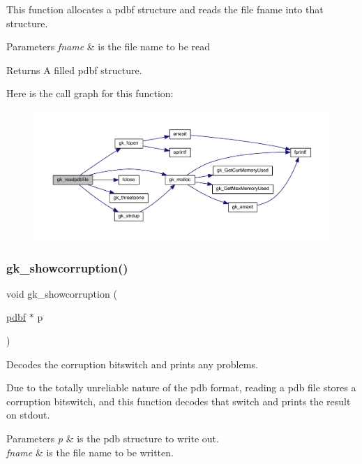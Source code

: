This function allocates a pdbf structure and reads the file fname into that structure.


\begin{DoxyParams}{Parameters}
{\em fname} & is the file name to be read \\
\hline
\end{DoxyParams}
\begin{DoxyReturn}{Returns}
A filled pdbf structure. 
\end{DoxyReturn}
Here is the call graph for this function\+:\nopagebreak
\begin{figure}[H]
\begin{center}
\leavevmode
\includegraphics[width=350pt]{a00125_a297ec0561d579a1772f424fce8886d96_cgraph}
\end{center}
\end{figure}
\mbox{\label{a00125_ac07e046d84d58f44124e9b28e90d619c}} 
\subsubsection{\texorpdfstring{gk\+\_\+showcorruption()}{gk\_showcorruption()}}
{\footnotesize\ttfamily void gk\+\_\+showcorruption (\begin{DoxyParamCaption}\item[{\hyperlink{a00666}{pdbf} $\ast$}]{p }\end{DoxyParamCaption})}



Decodes the corruption bitswitch and prints any problems. 

Due to the totally unreliable nature of the pdb format, reading a pdb file stores a corruption bitswitch, and this function decodes that switch and prints the result on stdout.


\begin{DoxyParams}{Parameters}
{\em p} & is the pdb structure to write out. \\
\hline
{\em fname} & is the file name to be written. \\
\hline
\end{DoxyParams}
\mbox{\label{a00125_a6eb7d344c153ba6c0bbe608c18a4a2a1}} 
